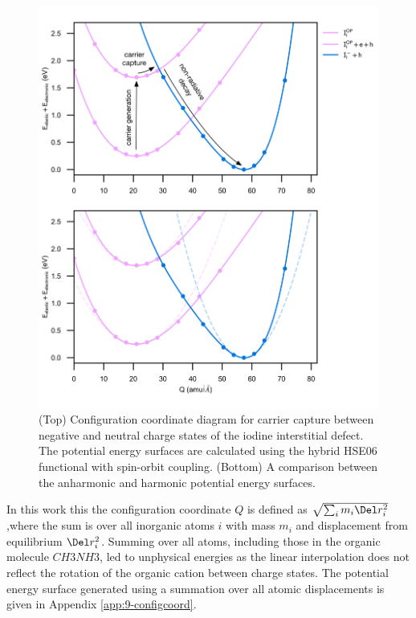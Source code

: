 \begin{figure}[h!]   
\centering
  \includegraphics[width=1.0\columnwidth]{figures/ch6/carrier_capture_digram.png}
  \caption[Configuration coordinate diagram for carrier capture between negative and neutral charge states of the iodine interstitial defect]{(Top) Configuration coordinate diagram for carrier capture between negative and neutral charge states of the iodine interstitial defect. The potential energy surfaces are calculated using the hybrid HSE06 functional with spin-orbit coupling. (Bottom) A comparison between the anharmonic and harmonic potential energy surfaces. }
\label{configuration_coordinate}
\end{figure}

In this work this the configuration coordinate $Q$ is defined as $\sqrt{\sum_i m_i \Del r_i^2}$ ,where the sum is over all inorganic atoms $i$ with mass $m_i$ and displacement from equilibrium $\Del r_i^2$. Summing over all atoms, including those in the organic molecule $CH3NH3$, led to unphysical energies as the linear interpolation does not reflect the rotation of the organic cation between charge states. The potential energy surface generated using a summation over all atomic displacements is given in Appendix \ref{app:9-configcoord}.

